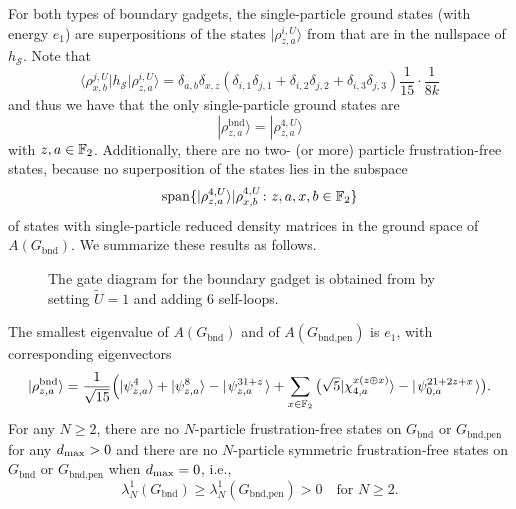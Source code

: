 \documentclass[../thesis-main/thesis-main]{subfiles}
\begin{document}
For both types of boundary gadgets, the single-particle ground states (with energy $e_{1}$) are superpositions of the states $|\rho_{z,a}^{i,U}\rangle$ from  that are in the nullspace of $h_{\mathcal{S}}$. Note that 
\begin{equation}
  \langle\rho_{x,b}^{j,U}|h_{\mathcal{S}}|\rho_{z,a}^{i,U}\rangle=\delta_{a,b}\delta_{x,z}\left(\delta_{i,1}\delta_{j,1}+\delta_{i,2}\delta_{j,2}+\delta_{i,3}\delta_{j,3}\right)\frac{1}{15}\cdot\frac{1}{8k}
\end{equation}
and thus we have that the only single-particle ground states are
\begin{equation}
  |\rho_{z,a}^{\text{bnd}}\rangle = |\rho_{z,a}^{4,U}\rangle
\end{equation}
with $z,a\in\mathbb{F}_2$.  Additionally, there are no two- (or more) particle frustration-free states, because no superposition of the states  lies in the subspace 
\begin{equation}
\operatorname{span}\{ |\rho_{z,a}^{4,U}\rangle|\rho_{x,b}^{4,U} \colon z,a,x,b\in\mathbb{F}_2\} 
\end{equation}
of states with single-particle reduced density matrices in the ground space of $A(G_{\text{bnd}})$.  We summarize these results as follows.

\begin{figure}
\centering
  
  \caption{The gate diagram for the boundary gadget is obtained from  by setting $\tilde U=1$ and adding 6 self-loops.}
  \label{fig:GVbdy}
\end{figure}

\begin{lemma}\label{lem:boundary_lemma}
The smallest eigenvalue of $A(G_{\text{bnd}})$ and of $A(G_{\text{bnd,pen}})$ is $e_{1}$, with corresponding eigenvectors 
\begin{equation}
|\rho_{z,a}^{\text{bnd}}\rangle =\frac{1}{\sqrt{15}}\Big(|\psi_{z,a}^{4}\rangle+|\psi_{z,a}^{8}\rangle -|\mspace{2mu} \psi_{z,a}^{31+z} \mspace{2mu} \rangle
  	+\sum_{x\in\mathbb{F}_2}\big(\sqrt{5}|\chi_{4,a}^{x\left(z\oplus x\right)}\rangle - |\mspace{2mu} \psi_{0,a}^{21+2z + x} \mspace{2mu} \rangle  \big).\label{eq:rho_bnd}
\end{equation}
For any $N\geq 2$, there are no $N$-particle frustration-free states on $G_{\text{bnd}}$ or $G_{\text{bnd,pen}}$  for any $d_{\text{max}} >0$ and there are no $N$-particle symmetric frustration-free  states on $G_{\text{bnd}}$ or $G_{\text{bnd,pen}}$ when $d_{\text{max}} = 0$, i.e., 
\begin{equation}
  \lambda_{N}^{1} (G_{\text{bnd}}) \geq \lambda_{N}^{1}(G_{\text{bnd,pen}})>0\quad\text{for }N\geq2.
\end{equation}
\end{lemma}
\end{document}
